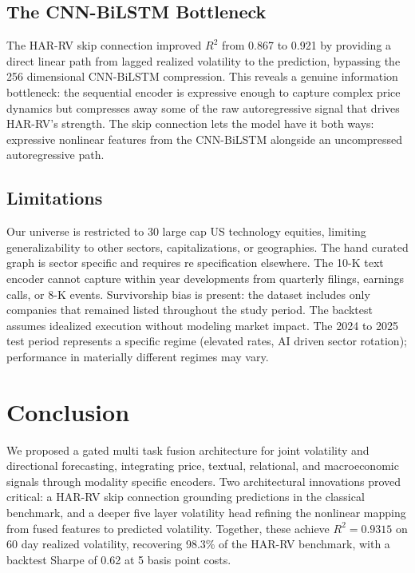 \documentclass[10pt, twocolumn, a4paper]{article}
\begin{document}
\subsection{The CNN{-}BiLSTM Bottleneck}

The HAR{-}RV skip connection improved $R^2$ from 0.867 to 0.921 by
providing a direct linear path from lagged realized volatility to the
prediction, bypassing the 256 dimensional CNN{-}BiLSTM compression. This
reveals a genuine information bottleneck: the sequential encoder is
expressive enough to capture complex price dynamics but compresses away some
of the raw autoregressive signal that drives HAR{-}RV's strength. The skip
connection lets the model have it both ways: expressive nonlinear features
from the CNN{-}BiLSTM alongside an uncompressed autoregressive path.

\subsection{Limitations}

Our universe is restricted to 30 large cap US technology equities, limiting
generalizability to other sectors, capitalizations, or geographies. The
hand curated graph is sector specific and requires re specification
elsewhere. The 10{-}K text encoder cannot capture within year developments
from quarterly filings, earnings calls, or 8{-}K events. Survivorship bias
is present: the dataset includes only companies that remained listed
throughout the study period. The backtest assumes idealized execution without
modeling market impact. The 2024 to 2025 test period represents a specific
regime (elevated rates, AI driven sector rotation); performance in materially
different regimes may vary.


\section{Conclusion}
\label{sec:conclusion}

We proposed a gated multi task fusion architecture for joint volatility and
directional forecasting, integrating price, textual, relational, and
macroeconomic signals through modality specific encoders. Two architectural
innovations proved critical: a HAR{-}RV skip connection grounding predictions
in the classical benchmark, and a deeper five layer volatility head
refining the nonlinear mapping from fused features to predicted volatility.
Together, these achieve $R^2 = 0.9315$ on 60 day realized volatility,
recovering 98.3\% of the HAR{-}RV benchmark, with a backtest Sharpe of 0.62
at 5 basis point costs.
\end{document}
